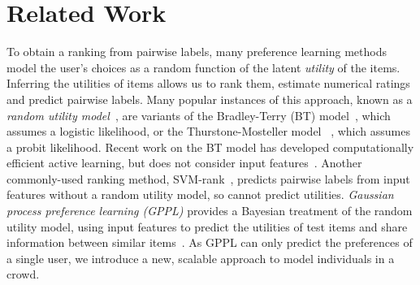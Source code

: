 

\section{Related Work}
\label{sec:rw}

To obtain a ranking from pairwise labels, 
many preference learning methods model
the user's choices as a random function of the latent 
\emph{utility} of the items.
Inferring the utilities of items allows us to rank them, estimate numerical ratings
and predict pairwise labels.
Many popular instances of this approach, known as a \emph{random utility model}~\citep{thurstone1927law},
are variants of  
the Bradley-Terry (BT) model~\citep{bradley1952rank,plackett1975analysis,luce1959possible},
which assumes a logistic likelihood,
or the Thurstone-Mosteller model
~\citep{thurstone1927law,mosteller2006remarks},
which assumes a probit likelihood.
Recent work on the BT model has 
developed computationally efficient active learning, but does not consider input 
features~\citep{li2018hybrid}.
Another commonly-used ranking method, SVM-rank~\citep{joachims2002optimizing},
predicts pairwise labels from input features 
without a random utility model, so cannot predict utilities.
\emph{Gaussian process preference learning (GPPL)}
provides a Bayesian treatment of the random utility model,
using input features to predict the utilities of test items and share information
between similar items~\citep{chu2005preference}.
As GPPL can only predict the preferences of a single user,  
we introduce a new, scalable approach to model individuals in a crowd. 

